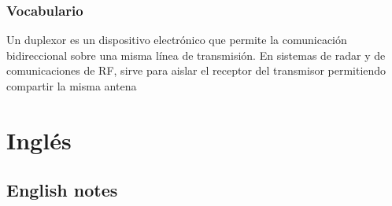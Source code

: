 \documentclass[
	11pt, %
	fleqn, %
	a4paper, %
]{LegrandOrangeBook}
\begin{document}
\section*{Vocabulario}
\begin{vocabulary}[Duplexer]
Un duplexor es un dispositivo electrónico que permite la comunicación bidireccional sobre una misma línea de transmisión. En sistemas de radar y de comunicaciones de RF, sirve para aislar el receptor del transmisor permitiendo compartir la misma antena
\end{vocabulary}
\part{Inglés}
\chapter{English notes}
\end{document}
